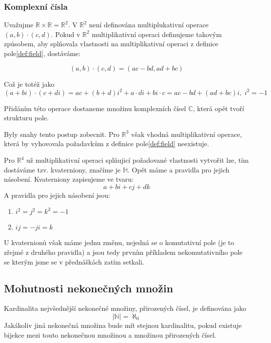 \subsubsection*{Komplexní čísla}
Uvažujme $\mathbb{R} \times \mathbb{R} = \mathbb{R}^2$. V $\mathbb{R}^2$ není
definována multiplukativní operace $(a, b) \cdot (c, d)$. Pokud v $\mathbb{R}^2$
multiplikativní operaci definujeme takovým způsobem, aby splňovala
vlastnosti na multiplikativní operaci z definice pole\ref{def:field}, dostáváme:

$$(a, b) \cdot (c, d) = (ac - bd, ad + bc)$$

Což je totéž jako
$$(a + bi) \cdot (c + di) = ac + (b + d)i^2 + a \cdot di + bi \cdot c = ac - bd + (ad + bc)i, \; i^2 = -1$$

Přidáním této operace dostaneme množinu komplexních čísel $\mathbb{C}$, která opět tvoří
strukturu pole.

Byly snahy tento postup zobecnit. Pro $\mathbb{R}^3$ však vhodná multiplikativní operace, která by
vyhovovala požadavkům z definice pole\ref{def:field} neexistuje.

Pro $\mathbb{R}^4$ už multiplikativní operaci splňujicí požadované vlastnosti vytvořit
lze, tím dostáváme tzv. kvaterniony, značíme je $\mathbb{H}$.
Opět máme  a pravidla pro jejich násobení.
Kvaterniony zapisujeme ve tvaru:
$$a + bi + cj + dk$$
A pravidla pro jejich násobení jsou:
\begin{enumerate}
    \item $i^2 = j^2 = k^2 = -1$
    \item $ij = -ji = k$
\end{enumerate}
U kvaternionů však máme jednu změnu, nejedná se o komutativní pole (je to zřejmé z druhého pravidla)
a jsou tedy prvním příkladem nekomutativního pole se kterým jsme se v přednáškách zatím setkali.

\subsection{Mohutnosti nekonečných množin}
Kardinalita nejvšednější nekonečné množiny, přirozených čísel, je definována jako 
$$|\mathbb{N}| = \aleph_0$$
Jakákoliv jiná nekonečná množina bude mít stejnou kardinalitu, pokud existuje bijekce
mezi touto nekonečnou množinou a množinou přirozených čísel.

